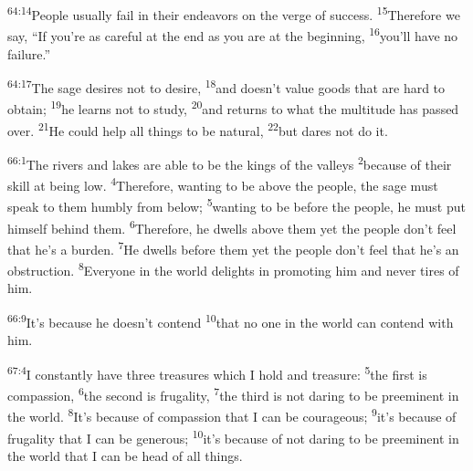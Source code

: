 \documentclass[openany,12pt,english]{book}
\newenvironment{para}{\par\pretolerance=100\tolerance=200\setlength{\emergencystretch}{0.6em}\relax}{\par}
\begin{document}
\begin{para}
    \textsuperscript{64:14}\thinspace{}Peo\-ple u\-su\-al\-ly fail in their endeavors on the verge of suc\-cess.
    \textsuperscript{15}\thinspace{}There\-fore we say, “If you're as care\-ful at the end as you are at the be\-gin\-ning,
    \textsuperscript{16}\thinspace{}you'll have no fail\-ure.”
\end{para}

\begin{para}
    \textsuperscript{64:17}\thinspace{}The sage desires not to de\-sire,
    \textsuperscript{18}\thinspace{}and does\-n't val\-ue goods that are hard to ob\-tain;
    \textsuperscript{19}\thinspace{}he learns not to stud\-y,
    \textsuperscript{20}\thinspace{}and returns to what the mul\-ti\-tude has passed o\-ver.
    \textsuperscript{21}\thinspace{}He could help all things to be nat\-u\-ral,
    \textsuperscript{22}\thinspace{}but dares not do it.
\end{para}

\bigskip{}

\begin{para}
    \textsuperscript{66:1}\thinspace{}The rivers and lakes are a\-ble to be the kings of the valleys
    \textsuperscript{2}\thinspace{}be\-cause of their skill at be\-ing low.
    \textsuperscript{4}\thinspace{}There\-fore, want\-ing to be a\-bove the peo\-ple, the sage must speak to them hum\-bly from be\-low;
    \textsuperscript{5}\thinspace{}want\-ing to be be\-fore the peo\-ple, he must put him\-self be\-hind them.
    \textsuperscript{6}\thinspace{}There\-fore, he dwells a\-bove them yet the peo\-ple don't feel that he's a bur\-den.
    \textsuperscript{7}\thinspace{}He dwells be\-fore them yet the peo\-ple don't feel that he's an ob\-struc\-tion.
    \textsuperscript{8}\thinspace{}Eve\-ry\-one in the world delights in pro\-mot\-ing him and nev\-er tires of him.
\end{para}

\begin{para}
    \textsuperscript{66:9}\thinspace{}It's be\-cause he does\-n't con\-tend
    \textsuperscript{10}\thinspace{}that no one in the world can con\-tend with him.
\end{para}

\bigskip{}

\begin{para}
    \textsuperscript{67:4}\thinspace{}I con\-stant\-ly have three treasures which I hold and treas\-ure:
    \textsuperscript{5}\thinspace{}the first is com\-pas\-sion,
    \textsuperscript{6}\thinspace{}the sec\-ond is fru\-gal\-i\-ty,
    \textsuperscript{7}\thinspace{}the third is not dar\-ing to be pre\-em\-i\-nent in the world.
    \textsuperscript{8}\thinspace{}It's be\-cause of com\-pas\-sion that I can be cou\-ra\-geous;
    \textsuperscript{9}\thinspace{}it's be\-cause of fru\-gal\-i\-ty that I can be gen\-er\-ous;
    \textsuperscript{10}\thinspace{}it's be\-cause of not dar\-ing to be pre\-em\-i\-nent in the world that I can be head of all things.
\end{para}
\end{document}
